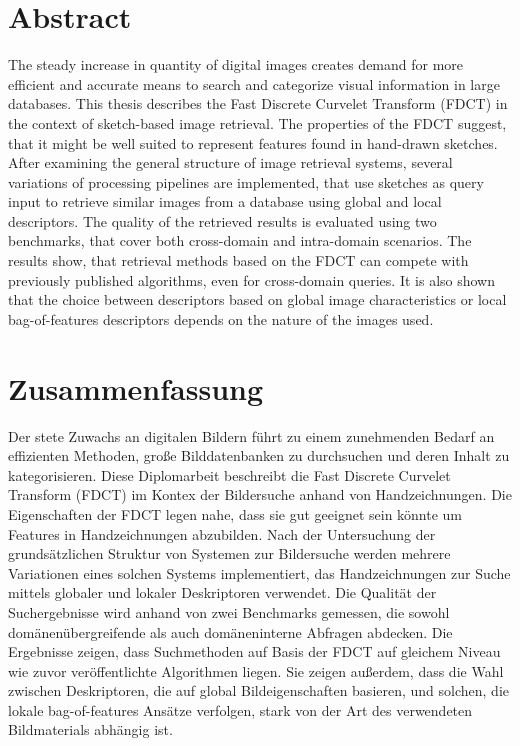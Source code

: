 \begingroup
\let\clearpage\relax
\let\cleardoublepage\relax
\let\cleardoublepage\relax

\chapter*{Abstract}
The steady increase in quantity of digital images creates demand for more
efficient and accurate means to search and categorize visual information in
large databases. This thesis describes the Fast Discrete Curvelet Transform
(FDCT) in the context of sketch-based image retrieval. The properties of the
FDCT suggest, that it might be well suited to represent features found in
hand-drawn sketches. After examining the general structure of image retrieval
systems, several variations of processing pipelines are implemented, that use
sketches as query input to retrieve similar images from a database using global
and local descriptors. The quality of the retrieved results is evaluated using
two benchmarks, that cover both cross-domain and intra-domain scenarios.
The results show, that retrieval methods based on the FDCT can compete with
previously published algorithms, even for cross-domain queries. It is also
shown that the choice between descriptors based on global image characteristics
or local bag-of-features descriptors depends on the nature of the images used.

\vfill

\chapter*{Zusammenfassung}
Der stete Zuwachs an digitalen Bildern führt zu einem zunehmenden Bedarf an
effizienten Methoden, große Bilddatenbanken zu durchsuchen und deren Inhalt zu
kategorisieren. Diese Diplomarbeit beschreibt die Fast Discrete Curvelet
Transform (FDCT) im Kontex der Bildersuche anhand von Handzeichnungen.
Die Eigenschaften der FDCT legen nahe, dass sie gut geeignet sein könnte um
Features in Handzeichnungen abzubilden. Nach der Untersuchung der
grundsätzlichen Struktur von Systemen zur Bildersuche werden mehrere
Variationen eines solchen Systems implementiert, das Handzeichnungen zur Suche
mittels globaler und lokaler Deskriptoren verwendet. Die Qualität der
Suchergebnisse wird anhand von zwei Benchmarks gemessen, die sowohl
domänenübergreifende als auch domäneninterne Abfragen abdecken.
Die Ergebnisse zeigen, dass Suchmethoden auf Basis der FDCT auf gleichem Niveau
wie zuvor veröffentlichte Algorithmen liegen. Sie zeigen außerdem, dass die
Wahl zwischen Deskriptoren, die auf global Bildeigenschaften basieren, und
solchen, die lokale bag-of-features Ansätze verfolgen, stark von der Art des
verwendeten Bildmaterials abhängig ist.

\endgroup			

\vfill
